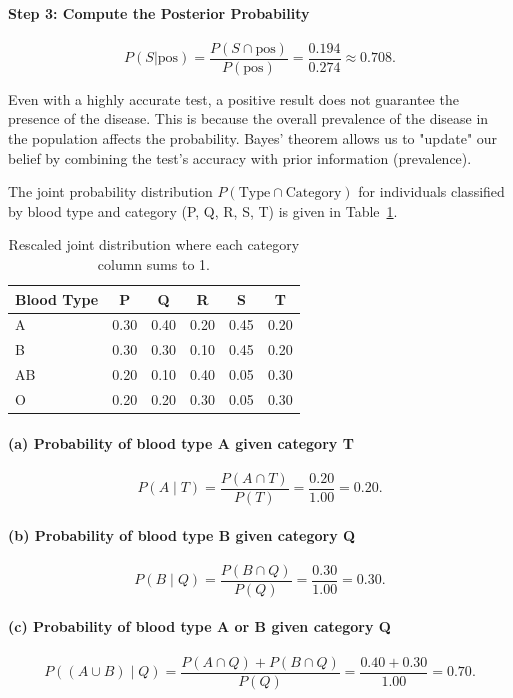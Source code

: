 \begin{eg}
\paragraph{Step 3: Compute the Posterior Probability}
\[
    P(S|\text{pos}) = \frac{P(S \cap \text{pos})}{P(\text{pos})} = \frac{0.194}{0.274} \approx 0.708.
\]

\begin{intuition}
Even with a highly accurate test, a positive result does not guarantee the presence of the disease. This is because the overall prevalence of the disease in the population affects the probability. Bayes' theorem allows us to "update" our belief by combining the test's accuracy with prior information (prevalence).
\end{intuition}
\end{eg}


\begin{eg}
The joint probability distribution \( P(\text{Type} \cap \text{Category}) \) for individuals classified by blood type and category (P, Q, R, S, T) is given in Table~\ref{tab:bloodtype}.

\begin{table}[H]
    \centering
    \begin{tabular}{l|ccccc}
        \toprule
        \textbf{Blood Type} & \textbf{P} & \textbf{Q} & \textbf{R} & \textbf{S} & \textbf{T} \\
        \midrule
        A  & 0.30 & 0.40 & 0.20 & 0.45 & 0.20 \\
        B  & 0.30 & 0.30 & 0.10 & 0.45 & 0.20 \\
        AB & 0.20 & 0.10 & 0.40 & 0.05 & 0.30 \\
        O  & 0.20 & 0.20 & 0.30 & 0.05 & 0.30 \\
        \bottomrule
    \end{tabular}
    \caption{Rescaled joint distribution where each category column sums to 1.}
    \label{tab:bloodtype}
\end{table}

\paragraph{(a) Probability of blood type A given category T}
\[
P(A \mid T) = \frac{P(A \cap T)}{P(T)} = \frac{0.20}{1.00} = 0.20.
\]

\paragraph{(b) Probability of blood type B given category Q}
\[
P(B \mid Q) = \frac{P(B \cap Q)}{P(Q)} = \frac{0.30}{1.00} = 0.30.
\]

\paragraph{(c) Probability of blood type A or B given category Q}
\[
P((A \cup B) \mid Q) = \frac{P(A \cap Q) + P(B \cap Q)}{P(Q)} 
= \frac{0.40 + 0.30}{1.00} = 0.70.
\]
\end{eg}

